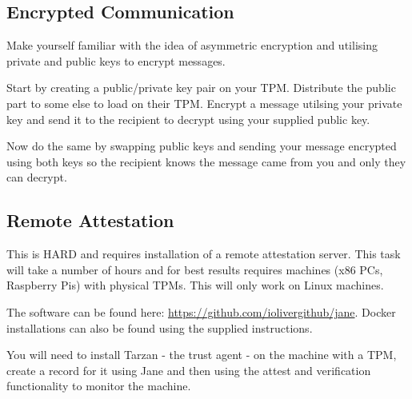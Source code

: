 \documentclass[11pt,a4paper]{article}
\begin{document}
\subsection{Encrypted Communication}
Make yourself familiar with the idea of asymmetric encryption and utilising private and public keys to encrypt messages.

Start by creating a public/private key pair on your TPM. Distribute the public part to some else to load on their TPM. Encrypt a message utilsing your private key and send it to the recipient to decrypt using your supplied public key.

Now do the same by swapping public keys and sending your message encrypted using both keys so the recipient knows the message came from you and only they can decrypt.

\subsection{Remote Attestation}
This is HARD and requires installation of a remote attestation server. This task will take a number of hours and for best results requires machines (x86 PCs, Raspberry Pis) with physical TPMs. This will only work on Linux machines.

The software can be found here: \url{https://github.com/iolivergithub/jane}. Docker installations can also be found using the supplied instructions.

You will need to install Tarzan - the trust agent - on the machine with a TPM, create a record for it using Jane and then using the attest and verification functionality to monitor the machine.
\end{document}
